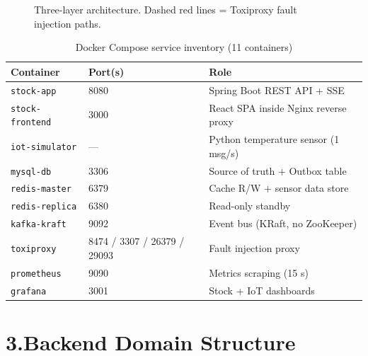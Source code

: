 \documentclass[11pt,a4paper]{article}
\begin{document}
\begin{figure}[H]
\caption{Three-layer architecture. Dashed red lines = Toxiproxy fault injection paths.}
\label{fig:arch}
\end{figure}

\begin{table}[H]
\centering
\caption{Docker Compose service inventory (11 containers)}
\label{tab:services}
\small
\begin{tabularx}{\textwidth}{@{}llX@{}}
\toprule
\textbf{Container} & \textbf{Port(s)} & \textbf{Role} \\
\midrule
\texttt{stock-app}      & 8080        & Spring Boot REST API + SSE \\
\texttt{stock-frontend} & 3000        & React SPA inside Nginx reverse proxy \\
\texttt{iot-simulator}  & ---         & Python temperature sensor (1 msg/s) \\
\texttt{mysql-db}       & 3306        & Source of truth + Outbox table \\
\texttt{redis-master}   & 6379        & Cache R/W + sensor data store \\
\texttt{redis-replica}  & 6380        & Read-only standby \\
\texttt{kafka-kraft}    & 9092        & Event bus (KRaft, no ZooKeeper) \\
\texttt{toxiproxy}      & 8474 / 3307 / 26379 / 29093 & Fault injection proxy \\
\texttt{prometheus}     & 9090        & Metrics scraping (15 s) \\
\texttt{grafana}        & 3001        & Stock + IoT dashboards \\
\bottomrule
\end{tabularx}
\end{table}

\section*{3.\quad Backend Domain Structure}
\end{document}
